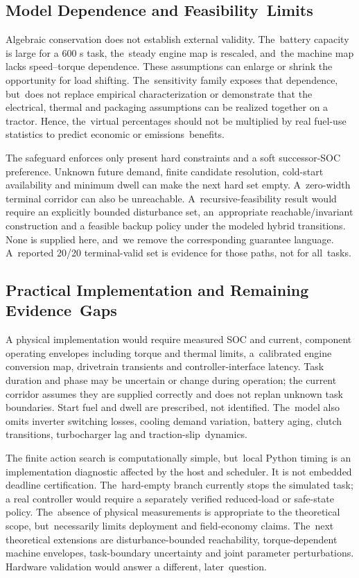 \documentclass[energies,article,submit,moreauthors]{Definitions/mdpi}
\begin{document}
\subsection{Model Dependence and Feasibility~Limits}
Algebraic conservation does not establish external validity. The~battery capacity is large for a 600 s task, the~steady engine map is rescaled, and~the machine map lacks speed--torque dependence. These assumptions can enlarge or shrink the opportunity for load shifting. The~sensitivity family exposes that dependence, but~does not replace empirical characterization or demonstrate that the electrical, thermal and packaging assumptions can be realized together on a tractor. Hence, the~virtual percentages should not be multiplied by real fuel-use statistics to predict economic or emissions~benefits.

The safeguard enforces only present hard constraints and a soft successor-SOC preference. Unknown future demand, finite candidate resolution, cold-start availability and minimum dwell can make the next hard set empty. A~zero-width terminal corridor can also be unreachable. A~recursive-feasibility result would require an explicitly bounded disturbance set, an~appropriate reachable/invariant construction and a feasible backup policy under the modeled hybrid transitions. None is supplied here, and~we remove the corresponding guarantee language. A~reported 20/20 terminal-valid set is evidence for those paths, not for all~tasks.

\subsection{Practical Implementation and Remaining Evidence~Gaps}
A physical implementation would require measured SOC and current, component operating envelopes including torque and thermal limits, a~calibrated engine conversion map, drivetrain transients and controller-interface latency. Task duration and phase may be uncertain or change during operation; the current corridor assumes they are supplied correctly and does not replan unknown task boundaries. Start fuel and dwell are prescribed, not identified. The~model also omits inverter switching losses, cooling demand variation, battery aging, clutch transitions, turbocharger lag and traction-slip~dynamics.

The finite action search is computationally simple, but~local Python timing is an implementation diagnostic affected by the host and scheduler. It is not embedded deadline certification. The~hard-empty branch currently stops the simulated task; a real controller would require a separately verified reduced-load or safe-state policy. The~absence of physical measurements is appropriate to the theoretical scope, but~necessarily limits deployment and field-economy claims. The~next theoretical extensions are disturbance-bounded reachability, torque-dependent machine envelopes, task-boundary uncertainty and joint parameter perturbations. Hardware validation would answer a different, later~question.
\end{document}
